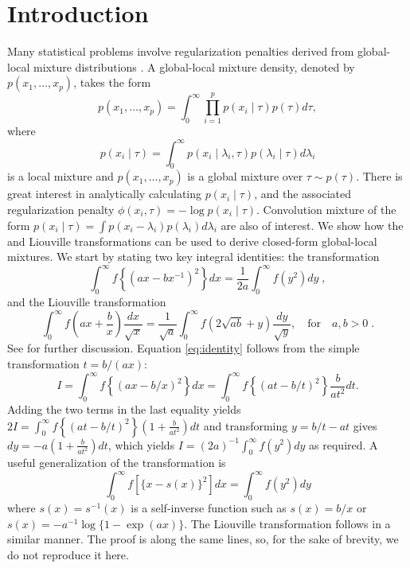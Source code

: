 \documentclass[lineno]{biometrika}
\begin{document}
\section{Introduction}
Many statistical problems involve regularization penalties derived from global-local mixture distributions \citep{polson_data_2011, hans2011comment,bhadra2015horseshoe+}. A global-local mixture density, denoted by $p(x_1, \ldots, x_p)$, takes the form 
\begin{equation*}
p(x_1, \ldots, x_p) = \int_{0}^{\infty}\prod_{i=1}^{p}  p(x_i \mid \tau) 
p(\tau) d\tau, 
\end{equation*}
where 
$$
p(x_i \mid \tau) = \int_{0}^{\infty} p(x_i \mid \lambda_i, \tau) 
p(\lambda_i \mid \tau) d\lambda_i
$$ 
is a local mixture and $p(x_1, \ldots, x_p)$ is a global mixture over 
$\tau \sim p(\tau)$. There is great interest in analytically calculating 
$p(x_i \mid \tau)$, and the associated regularization penalty 
$\phi(x_i, \tau) = -\log p(x_i \mid \tau)$.  Convolution mixture of the form 
$p(x_i \mid \tau) = \int p(x_i - \lambda_i) p(\lambda_i) d \lambda_i$ 
are also of interest. We show how the \CS{} and Liouville transformations can
be used to derive closed-form global-local mixtures.  We start by stating two
key integral identities: 
the \CS{} transformation 
\begin{equation}
  \int_0^\infty f \left\{ ( a x - b x^{-1} )^2 \right\} d x 
  = \frac{1}{2a} \int_0^\infty f(y^2) d y
  \;, 
  \label{eq:identity}
\end{equation}
and the Liouville transformation
\begin{equation}
  \int_{0}^{\infty} f\left(ax + \frac{b}{x} \right) \frac{dx}{\sqrt{x}} 
  = \frac{1}{\sqrt{a}} \int_{0}^{\infty} f\left( 2\sqrt{ab} + y \right) 
  \frac{dy}{\sqrt{y}}, \quad\text{for}\quad a, b >0
  \;. 
  \label{eq:liouville}
\end{equation}
See \cite{boros2006irresistible, baker2008probabilistic,
amdeberhan_cauchy-schlomilch_2010, jones_generating_2014} for further
discussion.  
Equation \eqref{eq:identity} follows from the simple transformation $t = b/(a x)$: 
\begin{equation*}
  I = \int_{0}^{\infty} f \left\{(ax - b/x)^2 \right\} dx 
  = \int_{0}^{\infty} f \left\{(at - b/t)^2 \right\} \frac{b}{a t^2} dt.
\end{equation*}
Adding the two terms in the last equality yields 
$2 I = \int_{0}^{\infty} f \left\{(at - b/t)^2 \right\} \left( 1+\frac{b}{a t^2} \right) dt$ 
and transforming $y = b/t - at$ gives $dy = -a (1+\frac{b}{a t^2}) dt$, which yields 
$I = (2a)^{-1} \int_{0}^{\infty} f(y^2) dy$ as required. A useful generalization
of the \CS{} transformation is
\begin{equation}
  \int_0^\infty f\left[ \{x-s(x)\}^2 \right] dx = 
  \int_0^\infty f( y^2 ) dy 
  \label{eq:gen}
\end{equation}
where $s(x)=s^{-1}(x)$ is a self-inverse function such as $s(x) = b/x$ or 
$s(x) = -a^{-1}\log\{1-\exp(a x)\}$. The Liouville transformation follows in a
similar manner.  The proof is along the same lines, so, for the sake
of brevity, we do not reproduce it here. 
\end{document}
